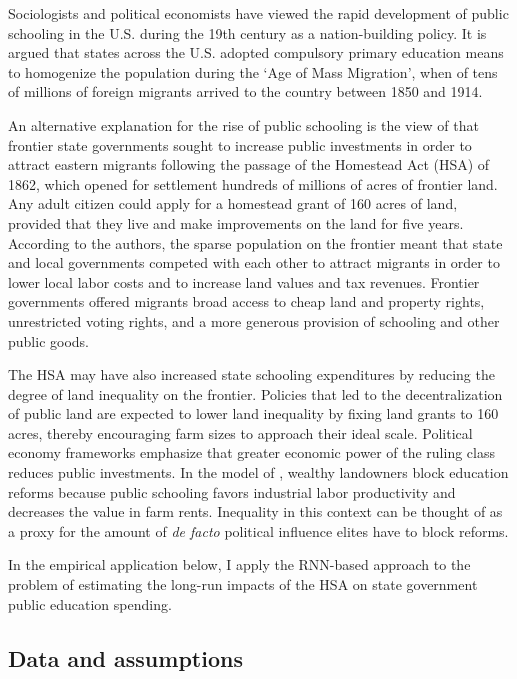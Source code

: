 Sociologists and political economists \citep[e.g,][]{meyer1979public,alesina2013nation,bandiera2018nation} have viewed the rapid development of public schooling in the U.S. during the 19th century as a nation-building policy. It is argued that states across the U.S. adopted compulsory primary education means to homogenize the population during the `Age of Mass Migration', when of tens of millions of foreign migrants arrived to the country between 1850 and 1914. 

An alternative explanation for the rise of public schooling is the view of \citet{engerman2005evolution} that frontier state governments sought to increase public investments in order to attract eastern migrants following the passage of the Homestead Act (HSA) of 1862, which opened for settlement hundreds of millions of acres of frontier land. Any adult citizen could apply for a homestead grant of 160 acres of land, provided that they live and make improvements on the land for five years.  According to the authors, the sparse population on the frontier meant that state and local governments competed with each other to attract migrants in order to lower local labor costs and to increase land values and tax revenues. Frontier governments offered migrants broad access to cheap land and property rights, unrestricted voting rights, and a more generous provision of schooling and other public goods.

The HSA may have also increased state schooling expenditures by reducing the degree of land inequality on the frontier. Policies that led to the decentralization of public land are expected to lower land inequality by fixing land grants to 160 acres, thereby encouraging farm sizes to approach their ideal scale. Political economy frameworks \citep[e.g.,][]{acemoglu2008persistence, besley2009origins} emphasize that greater economic power of the ruling class reduces public investments. In the model of \citet{galor2009inequality}, wealthy landowners block education reforms because public schooling favors industrial labor productivity and decreases the value in farm rents. Inequality in this context can be thought of as a proxy for the amount of \emph{de facto} political influence elites have to block reforms.

In the empirical application below, I apply the RNN-based approach to the problem of estimating the long-run impacts of the HSA on state government public education spending. 

\subsection{Data and assumptions} \label{educ-data}

